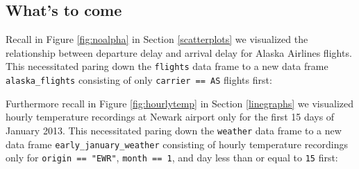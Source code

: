 \documentclass[12pt, krantz2,]{krantz}
\makeatletter
\newenvironment{Shaded}{\begin{snugshade}}{\end{snugshade}}
\newcommand{\DataTypeTok}[1]{\textcolor[rgb]{0.27,0.27,0.27}{#1}}
\newcommand{\DecValTok}[1]{\textcolor[rgb]{0.06,0.06,0.06}{#1}}
\newcommand{\KeywordTok}[1]{\textcolor[rgb]{0.27,0.27,0.27}{\textbf{#1}}}
\newcommand{\NormalTok}[1]{#1}
\newcommand{\OperatorTok}[1]{\textcolor[rgb]{0.43,0.43,0.43}{\textbf{#1}}}
\newcommand{\StringTok}[1]{\textcolor[rgb]{0.5,0.5,0.5}{#1}}
\newenvironment{kframe}{%
\medskip{}
\setlength{\fboxsep}{.8em}
 \def\at@end@of@kframe{}%
 \ifinner\ifhmode%
  \def\at@end@of@kframe{\end{minipage}}%
  \begin{minipage}{\columnwidth}%
 \fi\fi%
 \def\FrameCommand##1{\hskip\@totalleftmargin \hskip-\fboxsep
 \colorbox{shadecolor}{##1}\hskip-\fboxsep
     \hskip-\linewidth \hskip-\@totalleftmargin \hskip\columnwidth}%
 \MakeFramed {\advance\hsize-\width
   \@totalleftmargin\z@ \linewidth\hsize
   \@setminipage}}%
 {\par\unskip\endMakeFramed%
 \at@end@of@kframe}
\renewenvironment{Shaded}{\begin{kframe}}{\end{kframe}}
\makeatother
\begin{document}
\hypertarget{whats-to-come-3}{%
\subsection{What's to come}\label{whats-to-come-3}}

Recall in Figure \ref{fig:noalpha} in Section \ref{scatterplots} we visualized the relationship between departure delay and arrival delay for Alaska Airlines flights. This necessitated paring down the \texttt{flights} data frame to a new data frame \texttt{alaska\_flights} consisting of only \texttt{carrier\ ==\ AS} flights first:

\begin{Shaded}
\end{Shaded}

Furthermore recall in Figure \ref{fig:hourlytemp} in Section \ref{linegraphs} we visualized hourly temperature recordings at Newark airport only for the first 15 days of January 2013. This necessitated paring down the \texttt{weather} data frame to a new data frame \texttt{early\_january\_weather} consisting of hourly temperature recordings only for \texttt{origin\ ==\ "EWR"}, \texttt{month\ ==\ 1}, and day less than or equal to \texttt{15} first:

\begin{Shaded}
\end{Shaded}
\end{document}
